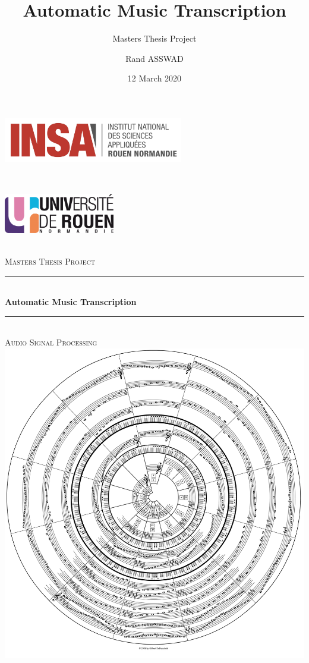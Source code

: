 \documentclass[
  american,
]{article}
\title{Automatic Music Transcription}
\subtitle{Masters Thesis Project}
\author{Rand ASSWAD}
\date{12 March 2020}
\newcommand{\HRule}{\rule{\linewidth}{0.5mm}}
\begin{document}
\maketitle

\begin{titlepage}
    \begin{sffamily}
        \begin{center}
            \begin{minipage}[c]{0.45\textwidth}
            \raggedright\includegraphics[height=2cm]{img/logo_insa.png}
            \end{minipage}~\hfill~%
            \begin{minipage}[c]{0.45\textwidth}
            \raggedleft\includegraphics[height=1.75cm]{img/logo_univ.png}
            \end{minipage}\\[2cm]

            \textsc{\huge Masters Thesis Project}\\[1cm]

            \HRule \\[0.4cm]
            {\huge \bfseries Automatic Music Transcription \\[0.4cm]}
            \HRule \\[1cm]
            
            \textsc{\huge Audio Signal Processing}\\[1cm]

            \includegraphics[width=.6\textwidth]{img/cover_img.png}~\\[2cm]


\end{center}
\end{sffamily}
\end{titlepage}
\end{document}
